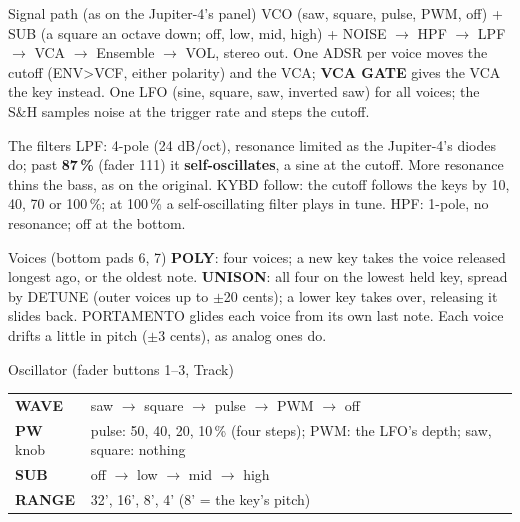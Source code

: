 \documentclass{article}
\newcommand{\VC}[1]{\textcolor{vcoc}{#1}}
\newcommand{\FL}[1]{\textcolor{fltc}{#1}}
\newcommand{\EG}[1]{\textcolor{egc}{#1}}
\newcommand{\EN}[1]{\textcolor{ensc}{#1}}
\begin{document}
\vspace{1.2mm}
\begin{minipage}[t]{72mm}\vspace{0pt}
\begin{card}{Signal path (as on the Jupiter-4's panel)}
\VC{VCO} (saw, square, pulse, PWM, off) + \VC{SUB} (a square an octave down; off, low, mid, high) +
\VC{NOISE} \(\to\) \FL{HPF} \(\to\) \FL{LPF} \(\to\) VCA \(\to\) \EN{Ensemble} \(\to\) VOL, stereo out.
One \EG{ADSR} per voice moves the cutoff (ENV>VCF, either polarity) and the VCA; \textbf{VCA GATE}
gives the VCA the key instead. One LFO (sine, square, saw, inverted saw) for all voices; the
\FL{S\&H} samples noise at the trigger rate and steps the cutoff.
\end{card}
\begin{card}{The filters}
\FL{LPF}: 4-pole (24 dB/oct), resonance limited as the Jupiter-4's diodes do; past \textbf{87\,\%}
(fader 111) it \textbf{self-oscillates}, a sine at the cutoff. More resonance thins the bass, as on
the original. \FL{KYBD} follow: the cutoff follows the keys by 10, 40, 70 or 100\,\%; at 100\,\% a
self-oscillating filter plays in tune. \FL{HPF}: 1-pole, no resonance; off at the bottom.
\end{card}
\end{minipage}\hfill
\begin{minipage}[t]{70mm}\vspace{0pt}
\begin{card}{Voices (bottom pads 6, 7)}
\textbf{POLY}: four voices; a new key takes the voice released longest ago, or the oldest note.
\textbf{UNISON}: all four on the lowest held key, spread by \VC{DETUNE} (outer voices up to
\(\pm\)20 cents); a lower key takes over, releasing it slides back. PORTAMENTO glides each voice
from its own last note. Each voice drifts a little in pitch (\(\pm\)3 cents), as analog ones do.
\end{card}
\begin{card}{Oscillator (fader buttons 1--3, Track)}
\fontsize{6.8}{8.1}\selectfont
\begin{tabularx}{\linewidth}{@{}l L@{}}
\VC{\textbf{WAVE}} & saw \(\to\) square \(\to\) pulse \(\to\) PWM \(\to\) off \\
\VC{\textbf{PW}} knob & pulse: 50, 40, 20, 10\,\% (four steps); PWM: the LFO's depth; saw, square: nothing \\
\VC{\textbf{SUB}} & off \(\to\) low \(\to\) mid \(\to\) high \\
\VC{\textbf{RANGE}} & 32', 16', 8', 4' (8' = the key's pitch) \\
\end{tabularx}
\end{card}
\end{minipage}\hfill
\end{document}
